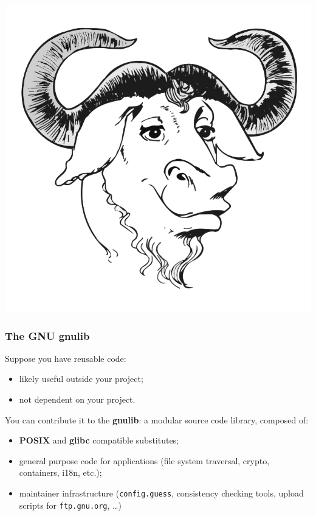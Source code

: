 \documentclass{beamer}
\begin{document}
\begin{frame}
  \begin{center}
    \includegraphics[scale=0.3]{gnu}
  \end{center}
\end{frame}

\begin{frame}
  \frametitle{The GNU gnulib}
  Suppose you have reusable code:
  \begin{itemize}
    \item likely useful outside your project;
    \item not dependent on your project.
  \end{itemize}
  \vfill
  You can contribute it to the \textbf{gnulib}: a modular source code library,
  composed of:
    \begin{itemize}
      \item \textbf{POSIX} and \textbf{glibc} compatible substitutes;
      \item general purpose code for applications (file system traversal,
        crypto, containers, i18n, etc.);
      \item maintainer infrastructure (\texttt{config.guess}, consistency
        checking tools, upload scripts for \texttt{ftp.gnu.org}, \ldots)
    \end{itemize}
\end{frame}
\end{document}
